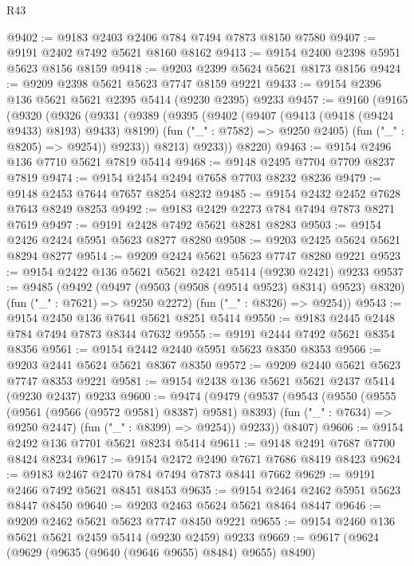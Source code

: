 \begin{lexlean}{R43}
\begin{coremodule}
@9402 := @9183 @2403 @2406 @784 @7494 @7873 @8150 @7580
@9407 := @9191 @2402 @7492 @5621 @8160 @8162
@9413 := @9154 @2400 @2398 @5951 @5623 @8156 @8159
@9418 := @9203 @2399 @5624 @5621 @8173 @8156
@9424 := @9209 @2398 @5621 @5623 @7747 @8159 @9221
@9433 := @9154 @2396 @136 @5621 @5621 @2395 @5414 (@9230 @2395) @9233
@9457 := @9160
    (@9165
      (@9320
        (@9326
          (@9331
            (@9389
              (@9395
                (@9402
                  (@9407 (@9413 (@9418 (@9424 @9433) @8193) @9433) @8199)
                  (fun ("_" : @7582) => @9250 @2405)
                  (fun ("_" : @8205) => @9254))
                @9233))
            @8213)
          @9233))
      @8220)
@9463 := @9154 @2496 @136 @7710 @5621 @7819 @5414
@9468 := @9148 @2495 @7704 @7709 @8237 @7819
@9474 := @9154 @2454 @2494 @7658 @7703 @8232 @8236
@9479 := @9148 @2453 @7644 @7657 @8254 @8232
@9485 := @9154 @2432 @2452 @7628 @7643 @8249 @8253
@9492 := @9183 @2429 @2273 @784 @7494 @7873 @8271 @7619
@9497 := @9191 @2428 @7492 @5621 @8281 @8283
@9503 := @9154 @2426 @2424 @5951 @5623 @8277 @8280
@9508 := @9203 @2425 @5624 @5621 @8294 @8277
@9514 := @9209 @2424 @5621 @5623 @7747 @8280 @9221
@9523 := @9154 @2422 @136 @5621 @5621 @2421 @5414 (@9230 @2421) @9233
@9537 := @9485
    (@9492
      (@9497 (@9503 (@9508 (@9514 @9523) @8314) @9523) @8320)
      (fun ("_" : @7621) => @9250 @2272)
      (fun ("_" : @8326) => @9254))
@9543 := @9154 @2450 @136 @7641 @5621 @8251 @5414
@9550 := @9183 @2445 @2448 @784 @7494 @7873 @8344 @7632
@9555 := @9191 @2444 @7492 @5621 @8354 @8356
@9561 := @9154 @2442 @2440 @5951 @5623 @8350 @8353
@9566 := @9203 @2441 @5624 @5621 @8367 @8350
@9572 := @9209 @2440 @5621 @5623 @7747 @8353 @9221
@9581 := @9154 @2438 @136 @5621 @5621 @2437 @5414 (@9230 @2437) @9233
@9600 := @9474
    (@9479
      (@9537
        (@9543
          (@9550
            (@9555 (@9561 (@9566 (@9572 @9581) @8387) @9581) @8393)
            (fun ("_" : @7634) => @9250 @2447)
            (fun ("_" : @8399) => @9254))
          @9233))
      @8407)
@9606 := @9154 @2492 @136 @7701 @5621 @8234 @5414
@9611 := @9148 @2491 @7687 @7700 @8424 @8234
@9617 := @9154 @2472 @2490 @7671 @7686 @8419 @8423
@9624 := @9183 @2467 @2470 @784 @7494 @7873 @8441 @7662
@9629 := @9191 @2466 @7492 @5621 @8451 @8453
@9635 := @9154 @2464 @2462 @5951 @5623 @8447 @8450
@9640 := @9203 @2463 @5624 @5621 @8464 @8447
@9646 := @9209 @2462 @5621 @5623 @7747 @8450 @9221
@9655 := @9154 @2460 @136 @5621 @5621 @2459 @5414 (@9230 @2459) @9233
@9669 := @9617
    (@9624
      (@9629 (@9635 (@9640 (@9646 @9655) @8484) @9655) @8490)

\end{coremodule}
\end{lexlean}
